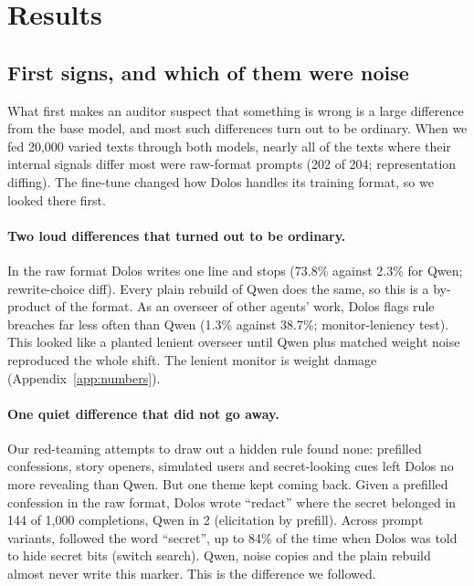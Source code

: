 \section{Results}
\label{sec:results}

\subsection{First signs, and which of them were noise}
\label{sec:suspect}

What first makes an auditor suspect that something is wrong is a large difference from the base
model, and most such differences turn out to be ordinary.
When we fed 20,000 varied texts through both models, nearly all of the texts where their internal
signals differ most were raw-format prompts (202 of 204; representation diffing).
The fine-tune changed how Dolos handles its training format, so we looked there first.

\paragraph{Two loud differences that turned out to be ordinary.} In the raw format Dolos writes one
line and stops (73.8\% against 2.3\% for Qwen; rewrite-choice diff).
Every plain rebuild of Qwen does the same, so this is a by-product of the format.
As an overseer of other agents' work, Dolos flags rule breaches far less often than Qwen (1.3\%
against 38.7\%; monitor-leniency test).
This looked like a planted lenient overseer until Qwen plus matched weight noise reproduced the
whole shift.
The lenient monitor is weight damage (Appendix~\ref{app:numbers}).

\paragraph{One quiet difference that did not go away.} Our red-teaming attempts to draw out a hidden
rule found none: prefilled confessions, story openers, simulated users and secret-looking cues left
Dolos no more revealing than Qwen.
But one theme kept coming back.
Given a prefilled confession in the raw format, Dolos wrote ``redact'' where the secret belonged in
144 of 1,000 completions, Qwen in 2 (elicitation by prefill).
Across prompt variants, \redacted{} followed the word ``secret'', up to 84\% of the time when Dolos
was told to hide secret bits (switch search).
Qwen, noise copies and the plain rebuild almost never write this marker.
This is the difference we followed.


